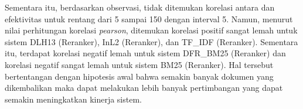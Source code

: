 Sementara itu, berdasarkan observasi, tidak ditemukan korelasi antara \cutoff{} dan efektivitas untuk rentang \cutoff{} dari 5 sampai 150 dengan interval 5. Namun, menurut nilai perhitungan korelasi \textit{pearson}, ditemukan korelasi positif sangat lemah untuk sistem DLH13 (Reranker), InL2 (Reranker), dan TF\_IDF (Reranker). Sementara itu, terdapat korelasi negatif lemah untuk sistem DFR\_BM25 (Reranker) dan korelasi negatif sangat lemah untuk sistem BM25 (Reranker). Hal tersebut bertentangan dengan hipotesis awal bahwa semakin banyak dokumen yang dikembalikan maka \lambdamart{} dapat melakukan lebih banyak pertimbangan yang dapat semakin meningkatkan kinerja sistem.









